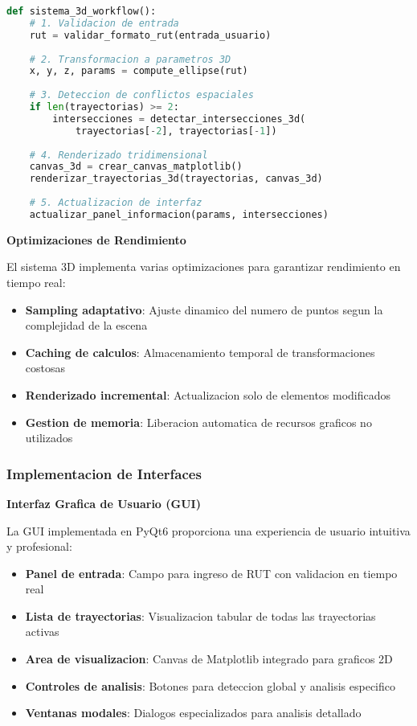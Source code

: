 \documentclass[12pt,a4paper]{article}
\begin{document}
\begin{lstlisting}[language=Python, caption=Flujo principal del sistema 3D]
def sistema_3d_workflow():
    # 1. Validacion de entrada
    rut = validar_formato_rut(entrada_usuario)
    
    # 2. Transformacion a parametros 3D
    x, y, z, params = compute_ellipse(rut)
    
    # 3. Deteccion de conflictos espaciales
    if len(trayectorias) >= 2:
        intersecciones = detectar_intersecciones_3d(
            trayectorias[-2], trayectorias[-1])
    
    # 4. Renderizado tridimensional
    canvas_3d = crear_canvas_matplotlib()
    renderizar_trayectorias_3d(trayectorias, canvas_3d)
    
    # 5. Actualizacion de interfaz
    actualizar_panel_informacion(params, intersecciones)
\end{lstlisting}

\textbf{Optimizaciones de Rendimiento}

El sistema 3D implementa varias optimizaciones para garantizar rendimiento en tiempo real:

\begin{itemize}
    \item \textbf{Sampling adaptativo}: Ajuste dinamico del numero de puntos segun la complejidad de la escena
    \item \textbf{Caching de calculos}: Almacenamiento temporal de transformaciones costosas
    \item \textbf{Renderizado incremental}: Actualizacion solo de elementos modificados
    \item \textbf{Gestion de memoria}: Liberacion automatica de recursos graficos no utilizados
\end{itemize}

\subsubsection{Implementacion de Interfaces}

\textbf{Interfaz Grafica de Usuario (GUI)}

La GUI implementada en PyQt6 proporciona una experiencia de usuario intuitiva y profesional:

\begin{itemize}
    \item \textbf{Panel de entrada}: Campo para ingreso de RUT con validacion en tiempo real
    \item \textbf{Lista de trayectorias}: Visualizacion tabular de todas las trayectorias activas
    \item \textbf{Area de visualizacion}: Canvas de Matplotlib integrado para graficos 2D
    \item \textbf{Controles de analisis}: Botones para deteccion global y analisis especifico
    \item \textbf{Ventanas modales}: Dialogos especializados para analisis detallado
\end{itemize}
\end{document}
